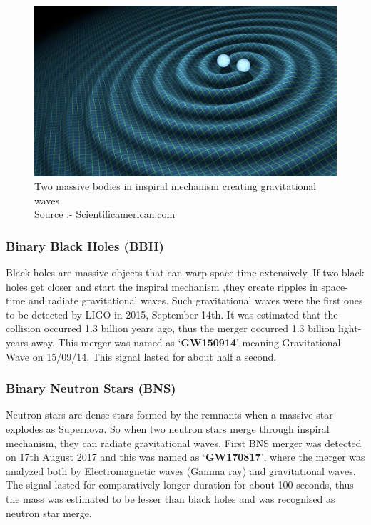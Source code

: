 \begin{figure}[h]
    \centering
    \includegraphics[height= 9.3 cm, width = 6in ]{images.tex/binaries.jpeg}
    \caption{Two massive bodies in inspiral mechanism creating gravitational waves \\
    Source :- \href{https://www.scientificamerican.com/article/gravitational-waves-discovered-from-colliding-black-holes1/}{Scientificamerican.com}}
\end{figure}

\pagebreak

\subsubsection{Binary Black Holes (BBH)}

Black holes are massive objects that can warp space-time extensively. If two black holes get closer and start the inspiral mechanism ,they create ripples in space-time and radiate gravitational waves. Such gravitational waves were the first ones to be detected by LIGO in 2015, September 14th. It was estimated that the collision occurred 1.3 billion years ago, thus the merger occurred 1.3 billion light-years away. This merger was named as `\textbf{GW150914}' meaning Gravitational Wave on 15/09/14. This signal lasted for about half a second.

\subsubsection{Binary Neutron Stars (BNS)}

Neutron stars are dense stars formed by the remnants when a massive star explodes as Supernova. So when two neutron stars merge through inspiral mechanism, they can radiate gravitational waves. First BNS merger was detected on 17th August 2017 and this was named as `\textbf{GW170817}', where the merger was analyzed both by Electromagnetic waves (Gamma ray) and gravitational waves. The signal lasted for comparatively longer duration for about 100 seconds, thus the mass was estimated to be lesser than black holes and was recognised as neutron star merge.

